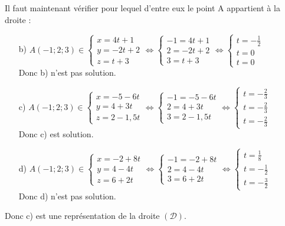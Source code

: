\documentclass[a4paper, 12pt]{article}
\begin{document}
Il faut maintenant vérifier pour lequel d'entre eux le point A appartient à la droite :
\vspace{3mm}
\begin{itemize}
    \item[b)] $A(-1; 2; 3) \in \begin{cases} x = 4t + 1 \\ y = -2t + 2 \\ z = t + 3 \end{cases} 
        \Leftrightarrow \begin{cases} -1 = 4t + 1\\ 2 = -2t + 2\\ 3 = t + 3\end{cases} 
        \Leftrightarrow \begin{cases} t = -\frac{1}{2} \\ t = 0 \\ t = 0\end{cases}$
        \\ Donc b) n'est pas solution. \vspace{3mm}
    \item[c)] $A(-1; 2; 3) \in \begin{cases} x = -5 - 6t \\ y = 4 + 3t \\ z = 2 - 1,5t \end{cases} 
        \Leftrightarrow \begin{cases} -1 = -5 -6t\\ 2 = 4 + 3t \\ 3 = 2 - 1,5t\end{cases} 
        \Leftrightarrow \begin{cases} t = -\frac{2}{3} \\ t = -\frac{2}{3} \\ t = - \frac{2}{3} \end{cases}$
        \\ Donc c) est solution. \vspace{3mm}
    \item[d)] $A(-1; 2; 3) \in \begin{cases} x = -2 + 8t \\ y = 4 - 4t \\ z = 6 + 2t \end{cases} 
        \Leftrightarrow \begin{cases} -1 = -2 +8t \\ 2 = 4 - 4t\\ 3 = 6 + 2t\end{cases} 
        \Leftrightarrow \begin{cases} t = \frac{1}{8} \\ t = -\frac{1}{2} \\ t = -\frac{3}{2} \end{cases}$
        \\ Donc d) n'est pas solution.
\end{itemize}
\vspace{3mm}
Donc c) est une représentation de la droite $(\mathcal{D})$.
\end{document}
